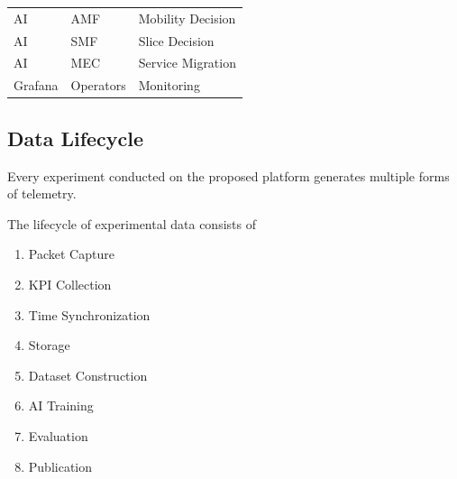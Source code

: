 \documentclass[12pt,a4paper]{article}\usepackage[a4paper,margin=1in]{geometry}\usepackage{graphicx}\usepackage{longtable}\usepackage{booktabs}\usepackage{hyperref}\usepackage{enumitem}\usepackage{amsmath}\usepackage{tikz}\usepackage{pgfgantt}\usepackage{setspace}\setstretch{1.15}\usetikzlibrary{positioning,arrows.meta,shapes.geometric}
\begin{document}
\begin{table}[h]
\begin{tabular}{lll}
			\\
			
			AI & AMF & Mobility Decision
			
			\\
			
			AI & SMF & Slice Decision
			
			\\
			
			AI & MEC & Service Migration
			
			\\
			
			Grafana & Operators & Monitoring
			
			\\
			
			\bottomrule
			
		\end{tabular}
		
	\end{table}
	
	
	\subsection{Data Lifecycle}
	
	Every experiment conducted on the proposed platform generates multiple forms of telemetry.
	
	The lifecycle of experimental data consists of
	
	\begin{enumerate}
		
		\item Packet Capture
		
		\item KPI Collection
		
		\item Time Synchronization
		
		\item Storage
		
		\item Dataset Construction
		
		\item AI Training
		
		\item Evaluation
		
		\item Publication
		
	\end{enumerate}
	
\end{document}
